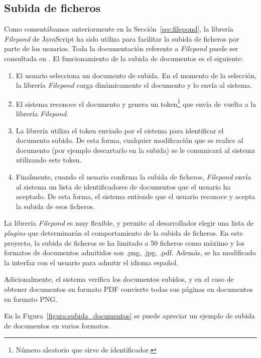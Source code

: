 \documentclass[a4paper, 12pt]{book}
\begin{document}
\subsection{Subida de ficheros}
\label{subsec:subida_ficheros}

Como comentábamos anteriormente en la Sección~\ref{sec:filepond}, la librería \textit{Filepond}
de JavaScript ha sido utiliza para facilitar la subida de ficheros por parte de los
usuarios. Toda la documentación referente a \textit{Filepond} puede
ser consultada en \cite{filepond:documentation}.
El funcionamiento de la subida de documentos es el siguiente:

\begin{enumerate}
  \item El usuario selecciona un documento de subida. En el momento de la selección,
  la librería \textit{Filepond} carga dinámicamente el documento y lo envía al sistema.
  \item El sistema reconoce el documento y genera un token\footnote{Número aleatorio
  que sirve de identificador.} que envía de vuelta a la librería \textit{Filepond}.
  \item La librería utiliza el token enviado por el sistema para identificar el documento
  subido. De esta forma, cualquier modificación que se realice al documento (por ejemplo
  descartarlo en la subida) se le comunicará al sistema utilizando este token.
  \item Finalmente, cuando el usuario confirma la subida de ficheros, \textit{Filepond} envía
  al sistema un lista de identificadores de documentos que el usuario ha aceptado.
  De esta forma, el sistema entiende que el usuario reconoce y acepta la subida de
  esos ficheros.
\end{enumerate}

La librería \textit{Filepond} es muy flexible, y permite al desarrollador elegir una lista de
\textit{plugins} que determinarán el comportamiento de la subida de ficheros. En este proyecto,
la subida de ficheros se ha limitado a 50 ficheros como máximo y los formatos de
documentos admitidos son .png, .jpg, .pdf. Además, se ha modificado la interfaz con
el usuario para admitir el idioma español.

Adicionalmente, el sistema verifica los documentos subidos, y en el caso de obtener
documentos en formato PDF convierte todas sus páginas en documentos en formato
PNG.

En la Figura~\ref{figura:subida_documentos} se puede apreciar un ejemplo de subida de documentos
en varios formatos.
\end{document}

